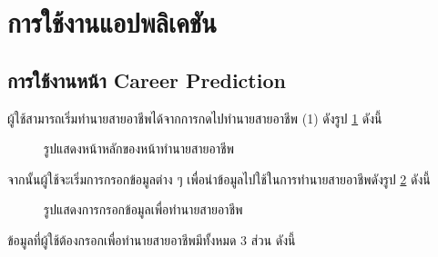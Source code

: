 \section{การใช้งานแอปพลิเคชัน}
\subsection{การใช้งานหน้า Career Prediction}
ผู้ใช้สามารถเริ่มทำนายสายอาชีพได้จากการกดไปทำนายสายอาชีพ (1) ดังรูป \ref{fig:start-CP} ดังนี้
\begin{figure}[H]\centering
    \caption{รูปแสดงหน้าหลักของหน้าทำนายสายอาชีพ}\label{fig:start-CP}
\end{figure}
จากนั้นผู้ใช้จะเริ่มการกรอกข้อมูลต่าง ๆ เพื่อนำข้อมูลไปใช้ในการทำนายสายอาชีพดังรูป \ref{fig:input-CP} ดังนี้
\begin{figure}[H]\centering
    \caption{รูปแสดงการกรอกข้อมูลเพื่อทำนายสายอาชีพ}\label{fig:input-CP}
\end{figure}
ข้อมูลที่ผู้ใช้ต้องกรอกเพื่อทำนายสายอาชีพมีทั้งหมด 3 ส่วน ดังนี้

